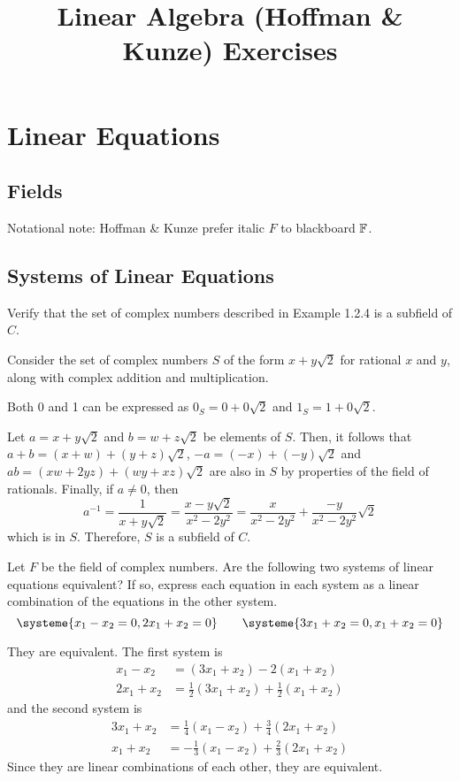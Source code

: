 \documentclass[notes]{agony}
\title{Linear Algebra (Hoffman \& Kunze) Exercises}
\begin{document}
\thispagestyle{firstpage}
\renewcommand{\contentsname}{Exercises\\{\Large from Hoffman \& Kunze, \emph{Linear Algebra}, 2nd ed.}}
\tableofcontents

\chapter{Linear Equations}
\section{Fields}\label{sec:fields}
Notational note: Hoffman \& Kunze prefer italic $F$ to blackboard $\mathbb{F}$.

\section{Systems of Linear Equations}

\begin{xca}
  Verify that the set of complex numbers described in Example 1.2.4 is a subfield of $C$.
\end{xca}
\begin{prf}
  Consider the set of complex numbers $S$ of the form $x + y\sqrt2$ for rational $x$ and $y$,
  along with complex addition and multiplication.

  Both 0 and 1 can be expressed as $0_S = 0+0\sqrt2$ and $1_S = 1 + 0\sqrt2$.

  Let $a = x + y\sqrt2$ and $b = w + z\sqrt2$ be elements of $S$.
  Then, it follows that $a+b = (x+w) + (y+z)\sqrt2$, $-a = (-x) + (-y)\sqrt2$
  and $ab = (xw + 2yz) + (wy + xz)\sqrt2$ are also in $S$ by properties of the field of rationals.
  Finally, if $a \neq 0$, then
  \[ a^{-1} = \frac{1}{x+y\sqrt2} = \frac{x-y\sqrt2}{x^2-2y^2} = \frac{x}{x^2-2y^2} + \frac{-y}{x^2-2y^2}\sqrt2 \]
  which is in $S$.
  Therefore, $S$ is a subfield of $C$.
\end{prf}

\begin{xca}\label{xca:sysequiv}
  Let $F$ be the field of complex numbers.
  Are the following two systems of linear equations equivalent?
  If so, express each equation in each system as a linear combination of the equations in the other system.
  \[ \systeme{x_1-x_2=0, 2x_1+x_2=0} \qquad \systeme{3x_1+x_2=0, x_1+x_2=0} \]
\end{xca}
\begin{prf}
  They are equivalent. The first system is
  \begin{align*}
    x_1 - x_2  & = (3x_1 + x_2) - 2(x_1 + x_2)                \\
    2x_1 + x_2 & = \tfrac12(3x_1 + x_2) + \tfrac12(x_1 + x_2)
  \end{align*}
  and the second system is
  \begin{align*}
    3x_1 + x_2 & = \tfrac14(x_1 - x_2) + \tfrac34(2x_1 + x_2)  \\
    x_1 + x_2  & = -\tfrac13(x_1 - x_2) + \tfrac23(2x_1 + x_2)
  \end{align*}
  Since they are linear combinations of each other, they are equivalent.
\end{prf}
\end{document}
